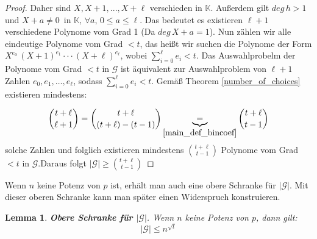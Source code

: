 \documentclass[12pt,oneside]{article}
\newtheorem{lemma}[theorem]{Lemma}
\theoremstyle{remark}
\theoremstyle{definition}
\begin{document}
\begin{proof}
Daher sind $X, X + 1, ..., X + \ell$ verschieden in $\mathbb{K}$. Außerdem gilt $deg \, h > 1$ und $X + a \neq 0 \,$ in $\mathbb{K}, \, \forall a, \, 0 \leq a \leq \ell $. Das bedeutet es existieren $\ell + 1$ verschiedene Polynome vom Grad 1 (Da $deg \, X + a = 1$). Nun zählen wir alle eindeutige Polynome vom Grad $ < t$, das heißt wir suchen die Polynome der Form $X^{e_0} \, (X + 1)^{e_1} \cdot \cdot \cdot (X + \ell)^{e_\ell}$, wobei $\sum_{i = 0}^{\ell} e_i < t$. Das Auswahlprobelm der Polynome vom Grad $ < t$ in $\mathcal{G}$ ist äquivalent zur Auswahlproblem von $\ell + 1$ Zahlen $e_0, e_1, \dots , e_\ell$, sodass $\sum_{i = 0}^{\ell} e_i < t$. Gemäß Theorem \ref{number_of_choices} existieren mindestens:

\begin{align*}
    {t + \ell \choose \ell + 1} = {t + \ell \choose (t + \ell) - (t - 1)} \underbrace{=}_{\ref{main_def_bincoef}} {t + \ell \choose t - 1} 
\end{align*}
solche Zahlen und folglich existieren mindestens ${t + \ell \choose t - 1}$ Polynome vom Grad $ < t $ in $\mathcal{G}$.\newline Daraus folgt $| \mathcal{G}| \geq {t + \ell \choose t - 1} $ 
\end{proof}

Wenn $n$ keine Potenz von $p$ ist, erhält man auch eine obere Schranke für $|\mathcal{G}|$. Mit dieser oberen Schranke kann man später einen Widerspruch konstruieren. 

\begin{lemma}\label{closing_lemma}
\textbf{Obere Schranke für $|\mathcal{G}|$}.\newline
Wenn $n$ keine Potenz von $p$, dann gilt:
\begin{equation}
    |\mathcal{G}| \leq  n^{\sqrt{t}}
\end{equation}
\end{lemma}
\end{document}
